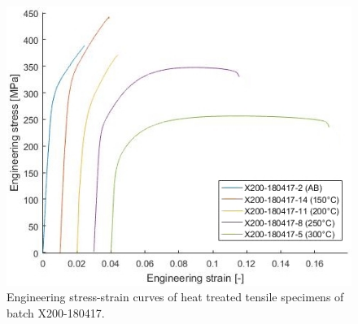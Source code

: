 \begin{center}
\begin{table}[ht]
\noindent{}

\caption[Average tensile mechanical properties of the heat-treated specimens from batch X200-180417]{Average tensile mechanical properties of the heat-treated specimens from batch X200-180417}
\label{tab:tracMHT}
\end{table}
 \end{center}

\begin{figure}[ht]
\centering
\centerline{\includegraphics[scale=0.7]{Images/TracTT}}
\decoRule
\caption[Engineering stress-strain curves of heat treated tensile specimens of batch X200-180417.]{Engineering stress-strain curves of heat treated tensile specimens of batch X200-180417.}
\label{fig:tracTT}
\end{figure}


